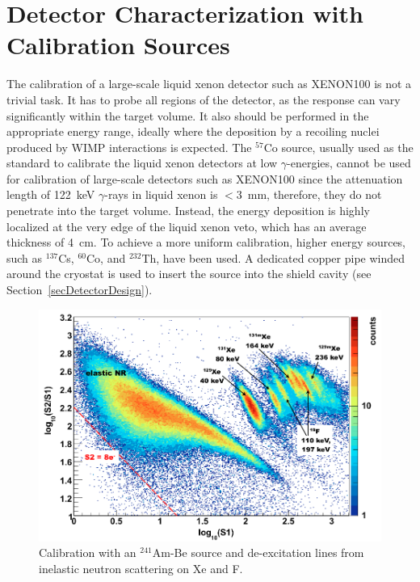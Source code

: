 \chapter{Detector Characterization with Calibration Sources}
\label{chDetectorCalibration}

The calibration of a large-scale liquid xenon detector such as XENON100 is not a trivial task. It has to probe all regions of the detector, as the response can vary significantly within the target volume. 
It also should be performed in the appropriate energy range, ideally where the deposition by a recoiling nuclei produced by WIMP interactions is expected. 
The $^{57}$Co source, usually used as the standard to calibrate the liquid xenon detectors at low $\gamma$-energies, cannot be used for calibration of large-scale detectors such as XENON100 since the attenuation length of 122~keV $\gamma$-rays in liquid xenon is $<$3~mm, therefore, they do not penetrate into the target volume. Instead, the energy deposition is highly localized at the very edge of the liquid xenon veto, which has an average thickness of 4~cm. 
To achieve a more uniform calibration, higher energy sources, such as $^{137}$Cs, $^{60}$Co, and $^{232}$Th, have been used. A dedicated copper pipe winded around the cryostat is used to insert the source into the shield cavity (see Section~\ref{secDetectorDesign}).

\begin{figure}[!b]
\centering
\includegraphics[width=0.7\linewidth]{plots/AmBeCalibration/AmBe_run10_withLabels1.png}
\caption[Calibration with an $^{241}$Am-Be source and de-excitation lines from inelastic neutron scattering on Xe and F]{Calibration with an $^{241}$Am-Be source and de-excitation lines from inelastic neutron scattering on Xe and F.}
\label{figAmBeLog}
\end{figure}

